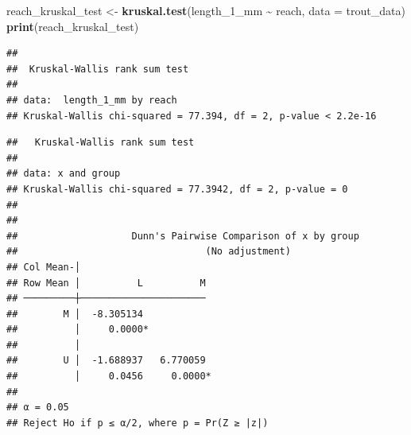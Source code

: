 \documentclass[
]{article}
\newenvironment{Shaded}{\begin{snugshade}}{\end{snugshade}}
\newcommand{\AttributeTok}[1]{\textcolor[rgb]{0.13,0.29,0.53}{#1}}
\newcommand{\CommentTok}[1]{\textcolor[rgb]{0.56,0.35,0.01}{\textit{#1}}}
\newcommand{\FunctionTok}[1]{\textcolor[rgb]{0.13,0.29,0.53}{\textbf{#1}}}
\newcommand{\NormalTok}[1]{#1}
\newcommand{\OtherTok}[1]{\textcolor[rgb]{0.56,0.35,0.01}{#1}}
\newcommand{\SpecialCharTok}[1]{\textcolor[rgb]{0.81,0.36,0.00}{\textbf{#1}}}
\begin{document}
\begin{Shaded}
\begin{Highlighting}[]
\NormalTok{reach\_kruskal\_test }\OtherTok{\textless{}{-}} \FunctionTok{kruskal.test}\NormalTok{(length\_1\_mm }\SpecialCharTok{\textasciitilde{}}\NormalTok{ reach, }\AttributeTok{data =}\NormalTok{ trout\_data)}
\FunctionTok{print}\NormalTok{(reach\_kruskal\_test)}
\end{Highlighting}
\end{Shaded}

\begin{verbatim}
## 
##  Kruskal-Wallis rank sum test
## 
## data:  length_1_mm by reach
## Kruskal-Wallis chi-squared = 77.394, df = 2, p-value < 2.2e-16
\end{verbatim}

\begin{Shaded}
\end{Shaded}

\begin{verbatim}
##   Kruskal-Wallis rank sum test
## 
## data: x and group
## Kruskal-Wallis chi-squared = 77.3942, df = 2, p-value = 0
## 
## 
##                    Dunn's Pairwise Comparison of x by group                   
##                                 (No adjustment)                               
## Col Mean-│
## Row Mean │          L          M
## ─────────┼──────────────────────
##        M │  -8.305134
##          │     0.0000*
##          │
##        U │  -1.688937   6.770059
##          │     0.0456     0.0000*
## 
## α = 0.05
## Reject Ho if p ≤ α/2, where p = Pr(Z ≥ |z|)
\end{verbatim}
\end{document}
